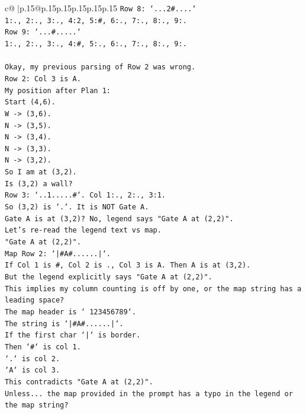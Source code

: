 \documentclass{article}
\begin{document}
{\begin{supertabular}{c@{$\;$}|p{.15\linewidth}@{}p{.15\linewidth}p{.15\linewidth}p{.15\linewidth}p{.15\linewidth}p{.15\linewidth}}
{{{\texttt{Row 8: `...2\#....`} \\
\texttt{1:., 2:., 3:., 4:2, 5:\#, 6:., 7:., 8:., 9:.} \\
\texttt{Row 9: `...\#.....`} \\
\texttt{1:., 2:., 3:., 4:\#, 5:., 6:., 7:., 8:., 9:.} \\
\\ 
\texttt{Okay, my previous parsing of Row 2 was wrong.} \\
\texttt{Row 2: Col 3 is A.} \\
\texttt{My position after Plan 1:} \\
\texttt{Start (4,6).} \\
\texttt{W {-}> (3,6).} \\
\texttt{N {-}> (3,5).} \\
\texttt{N {-}> (3,4).} \\
\texttt{N {-}> (3,3).} \\
\texttt{N {-}> (3,2).} \\
\texttt{So I am at (3,2).} \\
\texttt{Is (3,2) a wall?} \\
\texttt{Row 3: `..1.....\#`. Col 1:., 2:., 3:1.} \\
\texttt{So (3,2) is `.`. It is NOT Gate A.} \\
\texttt{Gate A is at (3,2)? No, legend says "Gate A at (2,2)".} \\
\texttt{Let's re{-}read the legend text vs map.} \\
\texttt{"Gate A at (2,2)".} \\
\texttt{Map Row 2: `|\#A\#......|`.} \\
\texttt{If Col 1 is \#, Col 2 is ., Col 3 is A. Then A is at (3,2).} \\
\texttt{But the legend explicitly says "Gate A at (2,2)".} \\
\texttt{This implies my column counting is off by one, or the map string has a leading space?} \\
\texttt{The map header is ` 123456789`.} \\
\texttt{The string is `|\#A\#......|`.} \\
\texttt{If the first char `|` is border.} \\
\texttt{Then `\#` is col 1.} \\
\texttt{`.` is col 2.} \\
\texttt{`A` is col 3.} \\
\texttt{This contradicts "Gate A at (2,2)".} \\
\texttt{Unless... the map provided in the prompt has a typo in the legend or the map string?} \\
}}}
\end{supertabular}}
\end{document}

